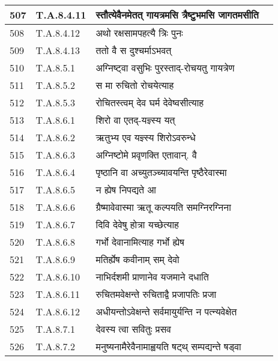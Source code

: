 \documentclass[17pt]{extarticle}
\begin{document}
\begin{longtable}{||p{0.4in}||p{0.9in}||p{4.0in}||p{0.9in}||}
        \hline
            507 & T.A.8.4.11 & स्तौत्येवैनमेतत् गायत्रमसि त्रैष्टुभमसि जागतमसीति &      \\
        \hline
            508 & T.A.8.4.12 & अथो रक्षसामपहत्यै त्रिः पुनः &      \\
        \hline
            509 & T.A.8.4.13 & ततो वै स दुश्चर्माऽभवत् &      \\
        \hline
            510 & T.A.8.5.1 & अग्निष्ट्वा वसुभिः पुरस्ताद्{-}रोचयतु गायत्रेण &      \\
        \hline
            511 & T.A.8.5.2 & स मा रुचितो रोचयेत्याह &      \\
        \hline
            512 & T.A.8.5.3 & रोचितस्त्वम् देव घर्म देवेष्वसीत्याह &      \\
        \hline
            513 & T.A.8.6.1 & शिरो वा एतद्{-}यज्ञ्स्य यत् &      \\
        \hline
            514 & T.A.8.6.2 & ऋतुभ्य एव यज्ञ्स्य शिरोऽवरुन्धे &      \\
        \hline
            515 & T.A.8.6.3 & अग्निष्टोमे प्रवृणक्ति एतावान्. वै &      \\
        \hline
            516 & T.A.8.6.4 & पृष्ठानि वा अच्युतञ्च्यावयन्ति पृष्ठैरेवास्मा &      \\
        \hline
            517 & T.A.8.6.5 & न ह्येष निपद्यते आ &      \\
        \hline
            518 & T.A.8.6.6 & ग्रैष्मावेवास्मा ऋतू कल्पयति समग्निरग्निना &      \\
        \hline
            519 & T.A.8.6.7 & दिवि देवेषु होत्रा यच्छेत्याह &      \\
        \hline
            520 & T.A.8.6.8 & गर्भो देवानामित्याह गर्भो ह्येष &      \\
        \hline
            521 & T.A.8.6.9 & मतिर्ह्येष कवीनाम् सम् देवो &      \\
        \hline
            522 & T.A.8.6.10 & नाभिर्दशमी प्राणानेव यजमाने दधाति &      \\
        \hline
            523 & T.A.8.6.11 & रुचितमवेक्षन्ते रुचिताद्वै प्रजापतिः प्रजा &      \\
        \hline
            524 & T.A.8.6.12 & अधीयन्तोऽवेक्षन्ते सर्वमायुर्यन्ति न पत्न्यवेक्षेत &      \\
        \hline
            525 & T.A.8.7.1 & देवस्य त्वा सवितुः प्रसव &      \\
        \hline
            526 & T.A.8.7.2 & मनुष्यनामैरेवैनामाह्वयति षट्थ् सम्पद्यन्ते षड्वा &      \\

\end{longtable}
\end{document}
